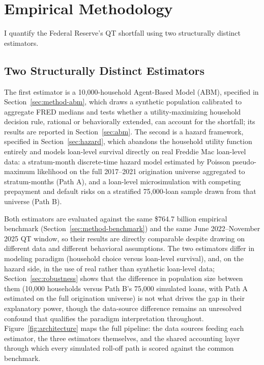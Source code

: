 \documentclass[12pt]{article}
\begin{document}
\section{Empirical Methodology}\label{sec:method}

I quantify the Federal Reserve's QT shortfall using two structurally distinct estimators.

\subsection{Two Structurally Distinct Estimators}\label{sec:method-estimators}

The first estimator is a 10,000-household Agent-Based Model (ABM), specified in Section~\ref{sec:method-abm}, which draws a synthetic population calibrated to aggregate FRED medians and tests whether a utility-maximizing household decision rule, rational or behaviorally extended, can account for the shortfall; its results are reported in Section~\ref{sec:abm}. The second is a hazard framework, specified in Section~\ref{sec:hazard}, which abandons the household utility function entirely and models loan-level survival directly on real Freddie Mac loan-level data: a stratum-month discrete-time hazard model estimated by Poisson pseudo-maximum likelihood on the full 2017--2021 origination universe aggregated to stratum-months (Path A), and a loan-level microsimulation with competing prepayment and default risks on a stratified 75,000-loan sample drawn from that universe (Path B).

Both estimators are evaluated against the same \$764.7 billion empirical benchmark (Section~\ref{sec:method-benchmark}) and the same June 2022--November 2025 QT window, so their results are directly comparable despite drawing on different data and different behavioral assumptions. The two estimators differ in modeling paradigm (household choice versus loan-level survival), and, on the hazard side, in the use of real rather than synthetic loan-level data; Section~\ref{sec:robustness} shows that the difference in population size between them (10,000 households versus Path B's 75,000 simulated loans, with Path A estimated on the full origination universe) is not what drives the gap in their explanatory power, though the data-source difference remains an unresolved confound that qualifies the paradigm interpretation throughout. Figure~\ref{fig:architecture} maps the full pipeline: the data sources feeding each estimator, the three estimators themselves, and the shared accounting layer through which every simulated roll-off path is scored against the common benchmark.
\end{document}
